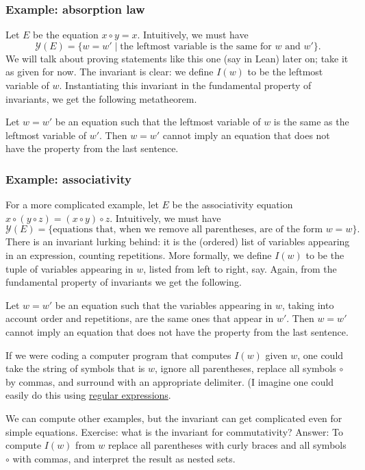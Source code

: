 \subsubsection*{Example: absorption law}
Let $E$ be the equation $x \circ y = x$. Intuitively, we must have
\[
\mathcal{Y}(E) = \{w = w' \mid \text{the leftmost variable is the same for $w$ and $w'$}\}.
\]
We will talk about proving statements like this one (say in Lean) later on; take it as given for now. The invariant is clear: we define $I(w)$ to be the leftmost variable of $w$. Instantiating this invariant in the fundamental property of invariants, we get the following metatheorem.
\begin{metatheorem}
	Let $w = w'$ be an equation such that the leftmost variable of $w$ is the same as the leftmost variable of $w'$. Then $w = w'$ cannot imply an equation that does not have the property from the last sentence.
\end{metatheorem}

\subsubsection*{Example: associativity}
For a more complicated example, let $E$ be the associativity equation $x \circ (y \circ z) = (x \circ y) \circ z$. Intuitively, we must have
\[
\mathcal{Y}(E) = \{\text{equations that, when we remove all parentheses, are of the form $w = w$}\}.
\]
There is an invariant lurking behind: it is the (ordered) list of variables appearing in an expression, counting repetitions. More formally, we define $I(w)$ to be the tuple of variables appearing in $w$, listed from left to right, say. Again, from the fundamental property of invariants we get the following.
\begin{metatheorem}
	Let $w = w'$ be an equation such that the variables appearing in $w$, taking into account order and repetitions, are the same ones that appear in $w'$. Then $w = w'$ cannot imply an equation that does not have the property from the last sentence.
\end{metatheorem}

If we were coding a computer program that computes $I(w)$ given $w$, one could take the string of symbols that is $w$, ignore all parentheses, replace all symbols $\circ$ by commas, and surround with an appropriate delimiter. (I imagine one could easily do this using \href{https://en.wikipedia.org/wiki/Regular_expression}{regular expressions}.

We can compute other examples, but the invariant can get complicated even for simple equations. Exercise: what is the invariant for commutativity? Answer: To compute $I(w)$ from $w$ replace all parentheses with curly braces and all symbols $\circ$ with commas, and interpret the result as nested sets.

